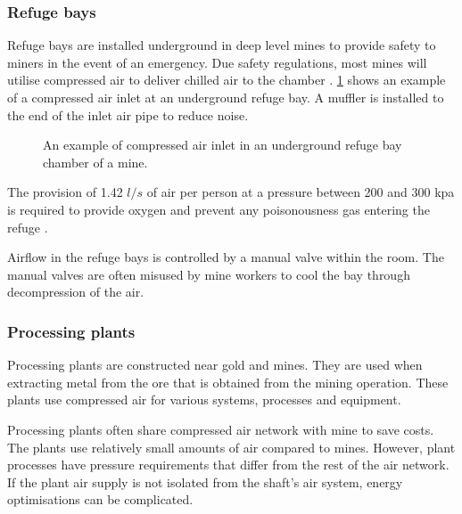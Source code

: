 \subsubsection{Refuge bays}
Refuge bays are installed underground in deep level mines to provide safety to miners in the event of an emergency. Due safety regulations, most mines will utilise compressed air to deliver chilled air to the chamber \cite{brake1999criteria}. \cref{fig: Refuge Bay} shows an example of a compressed air inlet at an underground refuge bay. A muffler is installed to the end of the inlet air pipe to reduce noise.
\begin{figure}[h]
	\centering
	\caption{An example of compressed air inlet in an underground refuge bay chamber of a mine.}
	\label{fig: Refuge Bay}
\end{figure}
\par The provision of 1.42 $l/s$ of air per person at a pressure between 200 and 300 \gls{kpa} is required to provide oxygen and prevent any poisonousness gas entering the refuge \cite{brake1999criteria}.
\par
Airflow in the refuge bays is controlled by a manual valve within the room. The manual valves are often misused by mine workers to cool the bay through decompression of the air. %
\subsubsection{Processing plants}
Processing plants are constructed near gold and mines. They are used when extracting metal from the ore that is obtained from the mining operation.  These plants use compressed air for various systems, processes and equipment. 
\par 
Processing plants often share compressed air network with mine to save costs\cite{Marais2012PhD}. The plants use relatively small amounts of air compared to mines. However, plant processes have pressure requirements that differ from the rest of the air network. If the plant air supply is not isolated from the shaft's air system, energy optimisations can be complicated. 
